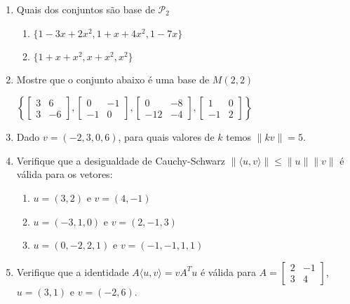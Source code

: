 \documentclass{article}
\begin{document}
\begin{enumerate}
\item Quais dos conjuntos s\~ao base de $\mathcal{P}_2$
	\begin{enumerate}
		\item $\{1-3x+2x^2, 1+x+4x^2, 1-7x\}$
		\item $\{1+x+x^2, x+x^2, x^2\}$
	\end{enumerate}

\item Mostre que o conjunto abaixo \'e uma base de $M(2, 2)$

	$\left\{
		\left[\begin{array}{cc}
				3 & 6 \\
				3 & -6
		\end{array}\right], 
		\left[\begin{array}{cc}
				0 & -1 \\
				-1 & 0
		\end{array}\right], 
		\left[\begin{array}{cc}
				0 & -8 \\
				-12 & -4
		\end{array}\right], 
		\left[\begin{array}{cc}
				1 & 0 \\
				-1 & 2
		\end{array}\right]
	\right\}$

\item Dado $v = (-2, 3, 0, 6)$, para quais valores de $k$ temos $\|kv\| = 5$.

\item Verifique que a desigualdade de Cauchy-Schwarz $\|\langle u, v \rangle\|
	\le \|u\| \|v\|$ \'e v\'alida para os vetores:
	\begin{enumerate}
		\item $u = (3, 2)$ e $v = (4, -1)$
		\item $u = (-3, 1, 0)$ e $v = (2, -1, 3)$
		\item $u = (0, -2, 2, 1)$ e $v = (-1, -1, 1, 1)$
	\end{enumerate}

\item Verifique que a identidade $A\langle u, v \rangle = vA^Tu$ \'e v\'alida para
	$A=\left[
		\begin{array}{cc}
			2 & -1 \\
			3 & 4
		\end{array}\right]$,
	$u = (3, 1)$ e $v = (-2, 6)$.


\end{enumerate}
\end{document}
